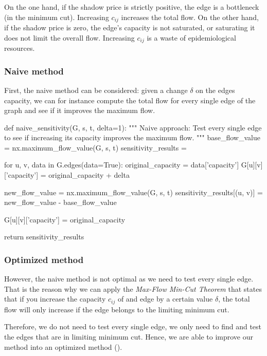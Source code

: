 \documentclass[12pt, openany]{article}
\begin{document}
On the one hand, if the shadow price is strictly positive, the edge is a bottleneck (in the minimum cut). Increasing $c_{ij}$ increases the total flow. On the other hand, if the shadow price is zero, the edge's capacity is not saturated, or saturating it does not limit the overall flow. Increasing $c_{ij}$ is a waste of epidemiological resources.

\subsubsection{Naive method}\label{sec:1_naive_method}

First, the naive method can be considered: given a change $\delta$ on the edges capacity, we can for instance compute the total flow for every single edge of the graph and see if it improves the maximum flow.

\begin{python}[caption={Python code for the optimized approach},  label={lst:1_naive_method_lst}]
def naive_sensitivity(G, s, t, delta=1):
    """
    Naive approach: Test every single edge to see if increasing its capacity improves the maximum flow.
    """
    base_flow_value = nx.maximum_flow_value(G, s, t)
    sensitivity_results = {}

    for u, v, data in G.edges(data=True):
        original_capacity = data['capacity']
        G[u][v]['capacity'] = original_capacity + delta
        
        new_flow_value = nx.maximum_flow_value(G, s, t)
        sensitivity_results[(u, v)] = new_flow_value - base_flow_value
        
        G[u][v]['capacity'] = original_capacity
        
    return sensitivity_results
\end{python}

\subsubsection{Optimized method}\label{sec:1_optimized_method}

However, the naive method is not optimal as we need to test every single edge. That is the reason why we can apply the \emph{Max-Flow Min-Cut Theorem} that states that if you increase the capacity $c_{ij}$ of and edge by a certain value $\delta$, the total flow will only increase if the edge belongs to the limiting minimum cut.

Therefore, we do not need to test every single edge, we only need to find and test the edges that are in limiting minimum cut. Hence, we are able to improve our method into an optimized method ().
\end{document}
